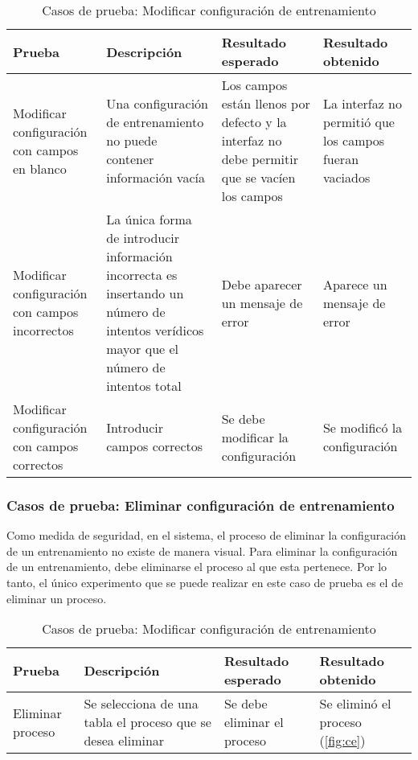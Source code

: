 \begin{table}[H]
\begin{center}
\begin{tabular}{ | p{4cm} | p{4cm} | p{3.1cm} | p{3cm} |}
\hline
\centering\textbf{Prueba} & \textbf{Descripción} & \textbf{Resultado \break esperado} & \textbf{Resultado \break obtenido} \\
\hline
Modificar configuración con campos en blanco & Una configuración de entrenamiento no puede contener información vacía & Los campos están llenos por defecto y la interfaz no debe permitir que se vacíen los campos & La interfaz no permitió que los campos fueran vaciados \\
\hline
Modificar configuración con campos incorrectos & La única forma de introducir información incorrecta es insertando un número de intentos verídicos mayor que el número de intentos total & Debe aparecer un mensaje de error & Aparece un mensaje de error \\
\hline
Modificar configuración con campos correctos & Introducir campos correctos & Se debe modificar la configuración  & Se modificó la configuración \\
\hline
\end{tabular}
\caption{Casos de prueba: Modificar configuración de entrenamiento}
\label{cas2}
\end{center}
\end{table}

\subsubsection{Casos de prueba: Eliminar configuración de entrenamiento}
Como medida de seguridad, en el sistema, el proceso de eliminar la configuración de un entrenamiento no existe de manera visual. Para eliminar la configuración de un entrenamiento, debe eliminarse el proceso al que esta pertenece. Por lo tanto, el único experimento que se puede realizar en este caso de prueba es el de eliminar un proceso.

\begin{table}[H]
\begin{center}
\begin{tabular}{ | p{3.3cm} | p{5.2cm} | p{3.1cm} | p{2.5cm} |}
\hline
\centering\textbf{Prueba} & \textbf{Descripción} & \textbf{Resultado \break esperado} & \textbf{Resultado \break obtenido} \\
\hline
Eliminar proceso & Se selecciona de una tabla el proceso que se desea eliminar & Se debe eliminar el proceso & Se eliminó el proceso (\ref{fig:ce}) \\
\hline
\end{tabular}
\caption{Casos de prueba: Modificar configuración de entrenamiento}
\label{cas3}
\end{center}
\end{table}